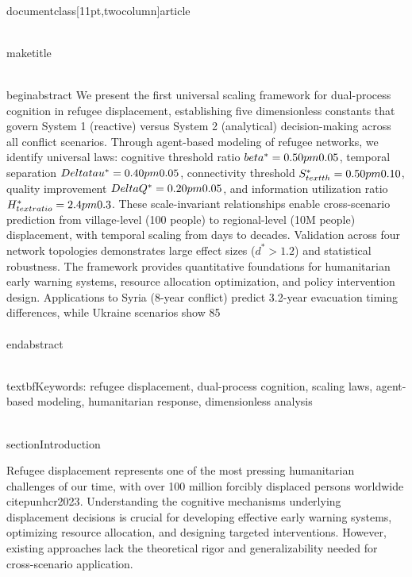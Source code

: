 \\documentclass[11pt,twocolumn]{article}
\begin{document}
\\maketitle

\\begin{abstract}
We present the first universal scaling framework for dual-process cognition in refugee displacement, establishing five dimensionless constants that govern System 1 (reactive) versus System 2 (analytical) decision-making across all conflict scenarios. Through agent-based modeling of refugee networks, we identify universal laws: cognitive threshold ratio $\\beta^* = 0.50 \\pm 0.05$, temporal separation $\\Delta\\tau^* = 0.40 \\pm 0.05$, connectivity threshold $S^*_{\\text{th}} = 0.50 \\pm 0.10$, quality improvement $\\Delta Q^* = 0.20 \\pm 0.05$, and information utilization ratio $H^*_{\\text{ratio}} = 2.4 \\pm 0.3$. These scale-invariant relationships enable cross-scenario prediction from village-level (100 people) to regional-level (10M people) displacement, with temporal scaling from days to decades. Validation across four network topologies demonstrates large effect sizes ($d^* > 1.2$) and statistical robustness. The framework provides quantitative foundations for humanitarian early warning systems, resource allocation optimization, and policy intervention design. Applications to Syria (8-year conflict) predict 3.2-year evacuation timing differences, while Ukraine scenarios show 85\\%
\\end{abstract}

\\textbf{Keywords:} refugee displacement, dual-process cognition, scaling laws, agent-based modeling, humanitarian response, dimensionless analysis

\\section{Introduction}

Refugee displacement represents one of the most pressing humanitarian challenges of our time, with over 100 million forcibly displaced persons worldwide \\citep{unhcr2023}. Understanding the cognitive mechanisms underlying displacement decisions is crucial for developing effective early warning systems, optimizing resource allocation, and designing targeted interventions. However, existing approaches lack the theoretical rigor and generalizability needed for cross-scenario application.
\end{document}
